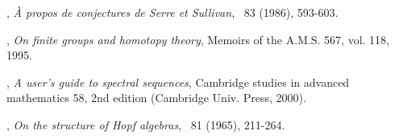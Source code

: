 \begin{thebibliography}{99}




, \textit{\`A propos de conjectures de Serre et Sullivan}, \INVEM\ 83 (1986), 593-603.


, \textit{On finite groups and homotopy theory}, Memoirs of the A.M.S. 567, vol. 118, 1995.


, \textit{A user's guide to spectral sequences}, Cambridge studies in advanced mathematics 58, 2nd edition (Cambridge Univ. Press, 2000).





, \textit{On the structure of Hopf algebras}, \ANNMAone\ 81 (1965), 211-264.



\end{thebibliography}
